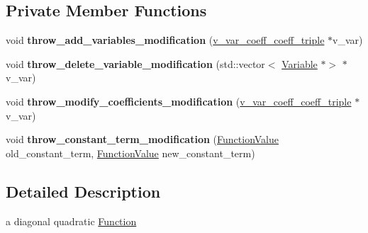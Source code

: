 \subsection*{Private Member Functions}
\begin{DoxyCompactItemize}
\item 
\mbox{\label{class_s_m_spp__di__unipi__it_1_1_d_quad_function_acdac432647d8f8a8a77c390fa8ef288c}} 
void {\bfseries throw\+\_\+add\+\_\+variables\+\_\+modification} (\mbox{\hyperlink{class_s_m_spp__di__unipi__it_1_1_d_quad_function_adaced695e00a65836eb558a7bfbd85f4}{v\+\_\+var\+\_\+coeff\+\_\+coeff\+\_\+triple}} $\ast$v\+\_\+var)
\item 
\mbox{\label{class_s_m_spp__di__unipi__it_1_1_d_quad_function_a3abfd295c5c99e9fac917946228019ba}} 
void {\bfseries throw\+\_\+delete\+\_\+variable\+\_\+modification} (std\+::vector$<$ \mbox{\hyperlink{class_s_m_spp__di__unipi__it_1_1_variable}{Variable}} $\ast$$>$ $\ast$v\+\_\+var)
\item 
\mbox{\label{class_s_m_spp__di__unipi__it_1_1_d_quad_function_ad0e48a2e1d56b00b8860c8b3bed71948}} 
void {\bfseries throw\+\_\+modify\+\_\+coefficients\+\_\+modification} (\mbox{\hyperlink{class_s_m_spp__di__unipi__it_1_1_d_quad_function_adaced695e00a65836eb558a7bfbd85f4}{v\+\_\+var\+\_\+coeff\+\_\+coeff\+\_\+triple}} $\ast$v\+\_\+var)
\item 
\mbox{\label{class_s_m_spp__di__unipi__it_1_1_d_quad_function_aafd1bf50720178a2979f00f4db1e9e62}} 
void {\bfseries throw\+\_\+constant\+\_\+term\+\_\+modification} (\mbox{\hyperlink{class_s_m_spp__di__unipi__it_1_1_function_a9ad432406b609e28d340f73e9474bffe}{Function\+Value}} old\+\_\+constant\+\_\+term, \mbox{\hyperlink{class_s_m_spp__di__unipi__it_1_1_function_a9ad432406b609e28d340f73e9474bffe}{Function\+Value}} new\+\_\+constant\+\_\+term)
\end{DoxyCompactItemize}


\subsection{Detailed Description}
a diagonal quadratic \mbox{\hyperlink{class_s_m_spp__di__unipi__it_1_1_function}{Function}} 

